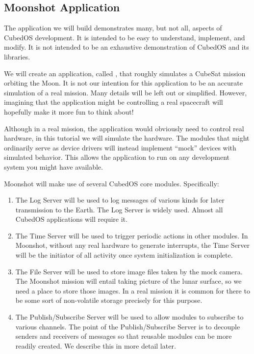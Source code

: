 \subsection{Moonshot Application}

The application we will build demonstrates many, but not all, aspects of CubedOS development. It
is intended to be easy to understand, implement, and modify. It is not intended to be an
exhaustive demonstration of CubedOS and its libraries.

We will create an application, called , that roughly simulates a CubeSat
mission orbiting the Moon. It is not our intention for this application to be an accurate
simulation of a real mission. Many details will be left out or simplified. However, imagining
that the application might be controlling a real spacecraft will hopefully make it more fun to
think about!

Although in a real mission, the application would obviously need to control real hardware, in
this tutorial we will simulate the hardware. The modules that might ordinarily serve as device
drivers will instead implement ``mock'' devices with simulated behavior. This allows the
application to run on any development system you might have available.

Moonshot will make use of several CubedOS core modules. Specifically:
\begin{enumerate}
  \item The Log Server will be used to log messages of various kinds for later transmission to
  the Earth. The Log Server is widely used. Almost all CubedOS applications will require it.

  \item The Time Server will be used to trigger periodic actions in other modules. In Moonshot,
  without any real hardware to generate interrupts, the Time Server will be the initiator of all
  activity once system initialization is complete.

  \item The File Server will be used to store image files taken by the mock camera. The Moonshot
  mission will entail taking picture of the lunar surface, so we need a place to store those
  images. In a real mission it is common for there to be some sort of non-volatile storage
  precisely for this purpose.

  \item The Publish/Subscribe Server will be used to allow modules to subscribe to various
  channels. The point of the Publish/Subscribe Server is to decouple senders and receivers of
  messages so that reusable modules can be more readily created. We describe this in more detail
  later.
\end{enumerate}

